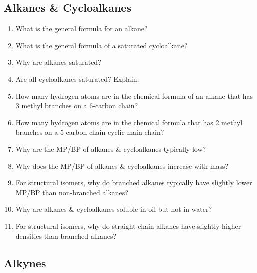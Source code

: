 \documentclass[12pt]{article}
\begin{document}
\begin{center}
    \subsection*{Alkanes \& Cycloalkanes}
\end{center}

\begin{enumerate}[label=\arabic*.]
    \item What is the general formula for an alkane?
    \vspace{1.5cm}
    \item What is the general formula of a saturated cycloalkane?
    \vspace{1.5cm}
    \item Why are alkanes saturated?
    \vspace{1.5cm}
    \item Are all cycloalkanes saturated? Explain.
    \vspace{1.5cm}
    \item How many hydrogen atoms are in the chemical formula of an alkane that has 3 methyl branches on a 6-carbon chain?
    \vspace{1.5cm}
    \item How many hydrogen atoms are in the chemical formula that has 2 methyl branches on a 5-carbon chain cyclic main chain?
    \vspace{1.5cm}
    \item Why are the MP/BP of alkanes \& cycloalkanes typically low?
    \vspace{1.5cm}
    \item Why does the MP/BP of alkanes \& cycloalkanes increase with mass?
    \vspace{1.5cm}
    \item For structural isomers, why do branched alkanes typically have slightly lower MP/BP than non-branched alkanes?
    \vspace{1.5cm}
    \item Why are alkanes \& cycloalkanes soluble in oil but not in water?
    \vspace{1.5cm}
    \item For structural isomers, why do straight chain alkanes have slightly higher densities than branched alkanes?
    \vspace{1.5cm}
\end{enumerate}

\begin{center}
    \subsection*{Alkynes}
\end{center}
\end{document}
